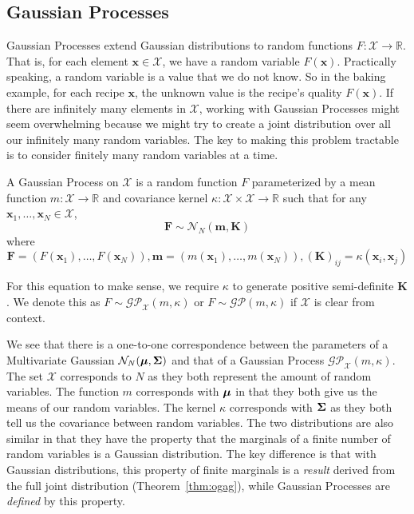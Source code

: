 \subsection{Gaussian Processes}\label{ssec:gp}

Gaussian Processes extend Gaussian distributions to random functions $F: \mathcal{X} \to \mathbb{R}$.
That is, for each element $\mathbf{x} \in \mathcal{X}$, we have a random variable $F(\mathbf{x})$.
Practically speaking, a random variable is a value that we do not know.
So in the baking example, for each recipe $\mathbf{x}$, the unknown value is the recipe's quality $F(\mathbf{x})$. %
If there are infinitely many elements in $\mathcal{X}$,
working with Gaussian Processes might seem overwhelming because we might try to create a joint distribution over all our infinitely many random variables.
The key to making this problem tractable is to consider finitely many random variables at a time.

\begin{definition}\label{def:gp}
    A Gaussian Process on $\mathcal{X}$ is a random function $F$ parameterized by a mean function
    $m: \mathcal{X} \to \mathbb{R}$ and covariance kernel $\kappa: \mathcal{X} \times \mathcal{X} \to \mathbb{R}$
    such that
    for any $\mathbf{x}_1, \dots,\mathbf{x}_N \in \mathcal{X}$,
    \begin{equation*}
        \mathbf{F} \sim \mathcal{N}_N\left(\mathbf{m}, \mathbf{K}\right)
    \end{equation*}
    where
    \begin{equation*}
        \mathbf{F} = (F(\mathbf{x}_1), \dots, F(\mathbf{x}_N)), \mathbf{m} = (m(\mathbf{x}_1), \dots, m(\mathbf{x}_N)), (\mathbf{K})_{ij} = \kappa(\mathbf{x}_i, \mathbf{x}_j)
    \end{equation*}

    For this equation to make sense, we require $\kappa$ to generate positive semi-definite $\mathbf{K}$.
    We denote this as $F \sim \mathcal{GP}_{\mathcal{X}}(m, \kappa)$
    or $F \sim \mathcal{GP}(m, \kappa)$ if $\mathcal{X}$ is clear from context.
\end{definition}

We see that there is a one-to-one correspondence between the parameters of a Multivariate Gaussian $\mathcal{N}_{N}(\boldsymbol{\mu}, \boldsymbol{\Sigma})$ and that of a Gaussian Process $\mathcal{GP}_{ \mathcal{X}}(m, \kappa)$.
The set $\mathcal{X}$ corresponds to $N$ as they both represent the amount of random variables.
The function $m$ corresponds with $\boldsymbol{\mu}$ in that they both give us the means of our random variables.
The kernel $\kappa$ corresponds with $\boldsymbol{\Sigma}$ as they both tell us the covariance between random variables.
The two distributions are also similar in that they have the property that the marginals of a finite number of random variables is a Gaussian distribution.
The key difference is that with Gaussian distributions, this property of finite marginals is a \emph{result} derived from the full joint distribution (Theorem~\ref{thm:ogag}), while Gaussian Processes are \emph{defined} by this property.

